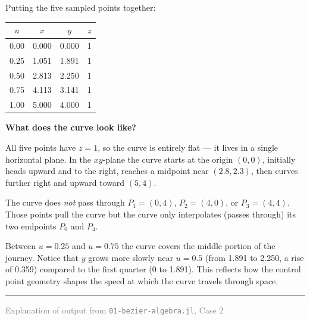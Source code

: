\documentclass[12pt, a4paper]{article}
\begin{document}
Putting the five sampled points together:

\begin{center}
\begin{tabular}{cccc}
\toprule
$u$ & $x$ & $y$ & $z$ \\
\midrule
0.00 & 0.000 & 0.000 & 1 \\
0.25 & 1.051 & 1.891 & 1 \\
0.50 & 2.813 & 2.250 & 1 \\
0.75 & 4.113 & 3.141 & 1 \\
1.00 & 5.000 & 4.000 & 1 \\
\bottomrule
\end{tabular}
\end{center}

\begin{notebox}
\textbf{What does the curve look like?}

\medskip
All five points have $z = 1$, so the curve is entirely flat ---
it lives in a single horizontal plane.
In the $xy$-plane the curve starts at the origin $(0, 0)$,
initially heads upward and to the right, reaches a midpoint
near $(2.8, 2.3)$, then curves further right and upward toward $(5, 4)$.

The curve does \emph{not} pass through $P_1 = (0,4)$, $P_2 = (4,0)$,
or $P_3 = (4,4)$.
Those points pull the curve but the curve only interpolates
(passes through) its two endpoints $P_0$ and $P_4$.

Between $u = 0.25$ and $u = 0.75$ the curve covers the middle
portion of the journey.
Notice that $y$ grows more slowly near $u = 0.5$ (from 1.891 to 2.250,
a rise of 0.359) compared to the first quarter (0 to 1.891).
This reflects how the control point geometry shapes the
speed at which the curve travels through space.
\end{notebox}

\vspace{2em}\hrule\vspace{0.5em}
{\small\textcolor{gray}{Explanation of output from \texttt{01-bezier-algebra.jl}, Case 2}}
\end{document}
